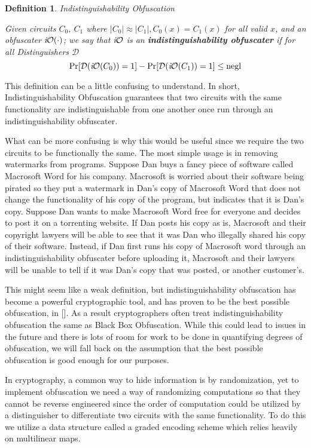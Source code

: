 \documentclass[12pt,twoside]{reedthesis}
\newtheorem{definition}{Definition}
\begin{document}
    \begin{definition}{Indistinguishability Obfuscation}
    \par Given circuits $C_0,\ C_1$ where $|C_0| \approx |C_1|, C_0(x) = C_1(x)$ for all valid $x$, and an obfuscater $\textit{i}\mathcal{O}(\cdot)$; we say that $\textit{i}\mathcal{O}$ is an \textbf{indistinguishability obfuscater} if for all Distinguishers $\mathcal{D}$
    $$\Pr[\mathcal{D}(\textit{i}\mathcal{O}(C_0)) = 1] -\Pr[\mathcal{D}(\textit{i}\mathcal{O}(C_1)) = 1] \leq \text{negl}$$
    \end{definition}
    
    \par This definition can be a little confusing to understand. In short, Indistinguishability Obfuscation guarantees that two circuits with the same functionality are indistinguishable from one another once run through an indistinguishability obfuscater. 
    \par What can be more confusing is why this would be useful since we require the two circuits to be functionally the same. The most simple usage is in removing watermarks from programs. Suppose Dan buys a fancy piece of software called Macrosoft Word for his company. Macrosoft is worried about their software being pirated so they put a watermark in Dan's copy of Macrosoft Word that does not change the functionality of his copy of the program, but indicates that it is Dan's copy. Suppose Dan wants to make Macrosoft Word free for everyone and decides to post it on a torrenting website. If Dan posts his copy as is, Macrosoft and their copyright lawyers will be able to see that it was Dan who illegally shared his copy of their software. Instead, if Dan first runs his copy of Macrosoft word through an indistinguishability obfuscater before uploading it, Macrosoft and their lawyers will be unable to tell if it was Dan's copy that was posted, or another customer's.
    \par This might seem like a weak definition, but indistinguishability obfuscation has become a powerful cryptographic tool, and has proven to be the best possible obfuscation, in [\cite{Goldwasser:2007:BO:1760749.1760765}]. As a result cryptographers often treat indistinguishability obfuscation the same as Black Box Obfuscation. While this could lead to issues in the future and there is lots of room for work to be done in quantifying degrees of obfuscation, we will fall back on the assumption that the best possible obfuscation is good enough for our purposes.
    \par In cryptography, a common way to hide information is by randomization, yet to implement obfuscation we need a way of randomizing computations so that they cannot be reverse engineered since the order of computation could be utilized by a distinguisher to differentiate two circuits with the same functionality. To do this we utilize a data  structure called a graded encoding scheme which relies heavily on multilinear maps. 
    
\end{document}

